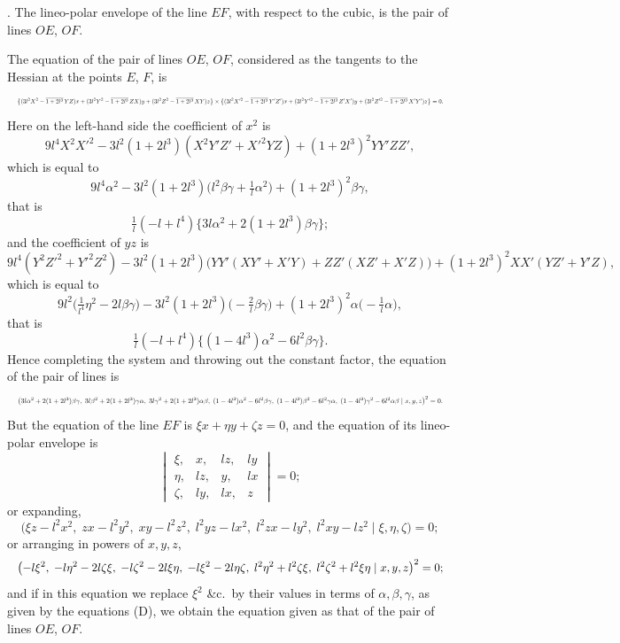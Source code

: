 \documentclass[11pt]{article}
\begin{document}
\medskip

. The lineo-polar envelope of the line $EF$, with respect to the cubic, is the pair of lines $OE$, $OF$.

The equation of the pair of lines $OE$, $OF$, considered as the tangents to the Hessian at the points $E$, $F$, is
\[
\resizebox{\textwidth}{!}{$\displaystyle \bigl\{(3 l^2 X^2 - \overline{1 + 2 l^3}\,Y Z) x + (3 l^2 Y^2 - \overline{1 + 2 l^3}\,Z X) y + (3 l^2 Z^2 - \overline{1 + 2 l^3}\,X Y) z\bigr\} \times \bigl\{(3 l^2 X'^2 - \overline{1 + 2 l^3}\,Y' Z') x + (3 l^2 Y'^2 - \overline{1 + 2 l^3}\,Z' X') y + (3 l^2 Z'^2 - \overline{1 + 2 l^3}\,X' Y') z\bigr\} = 0.$}
\]
Here on the left-hand side the coefficient of $x^2$ is
\[
9 l^4 X^2 X'^2 - 3 l^2 (1 + 2 l^3)(X^2 Y' Z' + X'^2 Y Z) + (1 + 2 l^3)^2 Y Y' Z Z',
\]
which is equal to
\[
9 l^4 \alpha^2 - 3 l^2 (1 + 2 l^3)\bigl( l^2 \beta\gamma + \tfrac{1}{l}\alpha^2\bigr) + (1 + 2 l^3)^2 \beta\gamma,
\]
that is
\[
\tfrac{1}{l}(-l + l^4)\bigl\{3 l \alpha^2 + 2(1 + 2 l^3)\beta\gamma\bigr\};
\]
and the coefficient of $y z$ is
\[
9 l^4 (Y^2 Z'^2 + Y'^2 Z^2) - 3 l^2 (1 + 2 l^3)\bigl(Y Y' (X Y' + X' Y) + Z Z' (X Z' + X' Z)\bigr) + (1 + 2 l^3)^2 X X' (Y Z' + Y' Z),
\]
which is equal to
\[
9 l^2 \bigl(\tfrac{1}{l^4}\eta^2 - 2 l \beta\gamma\bigr) - 3 l^2 (1 + 2 l^3)\bigl(-\tfrac{2}{l}\beta\gamma\bigr) + (1 + 2 l^3)^2 \alpha\bigl(-\tfrac{1}{l}\alpha\bigr),
\]
that is
\[
\tfrac{1}{l}(-l + l^4)\bigl\{(1 - 4 l^3)\alpha^2 - 6 l^2 \beta\gamma\bigr\}.
\]
Hence completing the system and throwing out the constant factor, the equation of the pair of lines is
\[
\resizebox{\textwidth}{!}{$\displaystyle \bigl(3 l\alpha^2 + 2(1 + 2 l^3)\beta\gamma,\; 3 l \beta^2 + 2(1 + 2 l^3)\gamma\alpha,\; 3 l \gamma^2 + 2(1 + 2 l^3)\alpha\beta,\; (1 - 4 l^3)\alpha^2 - 6 l^2 \beta\gamma,\; (1 - 4 l^3)\beta^2 - 6 l^2 \gamma\alpha,\; (1 - 4 l^3)\gamma^2 - 6 l^2 \alpha\beta \mid x, y, z\bigr)^2 = 0.$}
\]
But the equation of the line $EF$ is $\xi x + \eta y + \zeta z = 0$, and the equation of its lineo-polar envelope is
\[
\begin{vmatrix}
\xi, & x, & l z, & l y \\
\eta, & l z, & y, & l x \\
\zeta, & l y, & l x, & z
\end{vmatrix} = 0;
\]
or expanding,
\[
\bigl(\xi z - l^2 x^2,\; z x - l^2 y^2,\; x y - l^2 z^2,\; l^2 y z - l x^2,\; l^2 z x - l y^2,\; l^2 x y - l z^2 \mid \xi, \eta, \zeta\bigr) = 0;
\]
or arranging in powers of $x, y, z$,
\[
\resizebox{\textwidth}{!}{$\displaystyle \bigl(-l\xi^2,\; -l\eta^2 - 2 l \zeta\xi,\; -l\zeta^2 - 2 l \xi\eta,\; -l\xi^2 - 2 l \eta\zeta,\; l^2 \eta^2 + l^2 \zeta\xi,\; l^2 \zeta^2 + l^2 \xi\eta \mid x, y, z\bigr)^2 = 0;$}
\]
and if in this equation we replace $\xi^2$ \&c.\ by their values in terms of $\alpha, \beta, \gamma$, as given by the equations (D), we obtain the equation given as that of the pair of lines $OE$, $OF$.
\end{document}
